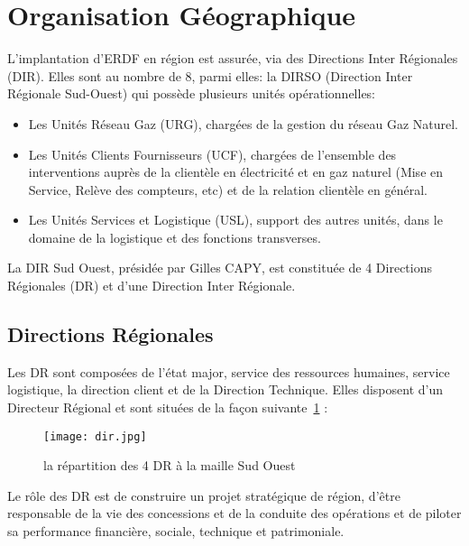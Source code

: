 \section{Organisation Géographique}
L'implantation d'ERDF en région est assurée, via des Directions Inter Régionales (DIR).
Elles sont au nombre de 8, parmi elles: la DIRSO (Direction Inter Régionale Sud-Ouest) qui possède plusieurs unités opérationnelles:
\begin{itemize}
\item Les Unités Réseau Gaz (URG), chargées de la gestion du réseau Gaz Naturel.
\item Les Unités Clients Fournisseurs (UCF), chargées de l'ensemble des interventions auprès de la clientèle en électricité et en gaz naturel (Mise en Service, Relève des compteurs, etc) et de la
relation clientèle en général.
\item Les Unités Services et Logistique (USL), support des autres unités, dans le domaine de la logistique et des fonctions transverses.
\end{itemize} 
La DIR Sud Ouest, présidée par Gilles CAPY, est constituée de 4 Directions Régionales (DR) et d'une Direction Inter Régionale.
\clearpage
\subsection*{Directions Régionales}
Les DR sont composées de l'état major, service des ressources humaines, service logistique, la direction client et de la Direction Technique.
Elles disposent d'un Directeur Régional et sont situées de la façon suivante~\ref{dirso} : 
\begin{figure}[h]
\centering
\texttt{[image: dir.jpg]}
\caption{\label{dirso}la répartition des 4 DR à la maille Sud Ouest}
\end{figure}
Le rôle des DR est de construire un projet stratégique de région, d'être responsable de la vie des concessions et de la conduite des opérations et de piloter sa performance financière, sociale, technique et patrimoniale.

